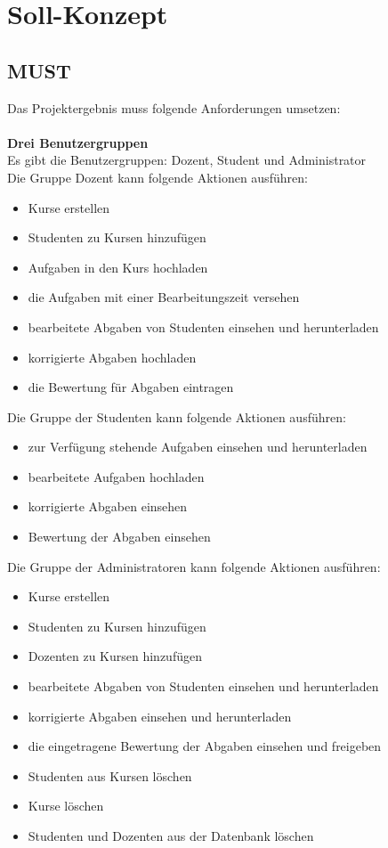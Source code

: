 
\chapter{Soll-Konzept}
\section{MUST}
Das Projektergebnis muss folgende Anforderungen umsetzen: \\ \\
\textbf{Drei Benutzergruppen} \\
Es gibt die Benutzergruppen: Dozent, Student und Administrator \\
Die Gruppe Dozent kann folgende Aktionen ausführen: 
\begin{itemize}
\item Kurse erstellen
\item Studenten zu Kursen hinzufügen 
\item Aufgaben in den Kurs hochladen
\item die Aufgaben mit einer Bearbeitungszeit versehen
\item bearbeitete Abgaben von Studenten einsehen und herunterladen
\item korrigierte Abgaben hochladen
\item die Bewertung für Abgaben eintragen
\end{itemize}
Die Gruppe der Studenten kann folgende Aktionen ausführen:
\begin{itemize}
\item zur Verfügung stehende Aufgaben einsehen und herunterladen
\item bearbeitete Aufgaben hochladen
\item korrigierte Abgaben einsehen
\item Bewertung der Abgaben einsehen
\end{itemize}
Die Gruppe der Administratoren kann folgende Aktionen ausführen:
\begin{itemize}
\item Kurse erstellen
\item Studenten zu Kursen hinzufügen
\item Dozenten zu Kursen hinzufügen
\item bearbeitete Abgaben von Studenten einsehen und herunterladen
\item korrigierte Abgaben einsehen und herunterladen
\item die eingetragene Bewertung der Abgaben einsehen und freigeben
\item Studenten aus Kursen löschen
\item Kurse löschen
\item Studenten und Dozenten aus der Datenbank löschen
\end{itemize}

